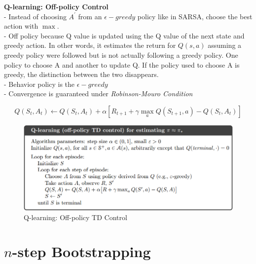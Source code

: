 \documentclass{article}
\begin{document}
\noindent
\textbf{Q-learning: Off-policy Control}\\
- Instead of choosing $A^{\prime}$ from an $\epsilon-greedy$ policy like in
SARSA, choose the best action with $\max$. \\
- Off policy because Q value is updated using the Q value of the next state and
greedy action. In other words, it estimates the return for $Q(s,a)$ assuming a
greedy policy were followed but is not actually following a greedy policy. One
policy to choose A and another to update Q. If the policy used to choose A is
greedy, the distinction between the two disappears.\\
- Behavior policy is the $\epsilon-greedy$\\
- Convergence is guaranteed under \textit{Robinson-Mouro Condition}

\begin{equation}
Q\left(S_{t}, A_{t}\right) \leftarrow Q\left(S_{t}, A_{t}\right)+\alpha\left[R_{t+1}+\gamma \max _{a} Q\left(S_{t+1}, a\right)-Q\left(S_{t}, A_{t}\right)\right]
\end{equation}

\begin{figure}[h]
\includegraphics[scale=0.4]{offpolicy_qlearning}
\centering
\caption{Q-learning: Off-policy TD Control}
\end{figure}

\newpage
\noindent
\section{$n$-step Bootstrapping}
\end{document}
